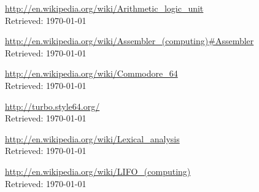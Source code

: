 \documentclass{article}
\begin{document}
\begin{thebibliography}{}
{\url{http://en.wikipedia.org/wiki/Arithmetic_logic_unit}\\
Retrieved: \today}

{\url{http://en.wikipedia.org/wiki/Assembler_(computing)#Assembler}\\
Retrieved: \today}

{\url{http://en.wikipedia.org/wiki/Commodore_64}\\
Retrieved: \today}

{\url{http://turbo.style64.org/}\\
Retrieved: \today}

{\url{http://en.wikipedia.org/wiki/Lexical_analysis}\\
Retrieved: \today}

{\url{http://en.wikipedia.org/wiki/LIFO_(computing)}\\
Retrieved: \today}
\end{thebibliography}
\end{document}
